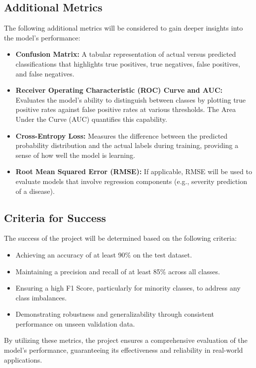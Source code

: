 \subsection{Additional Metrics}
The following additional metrics will be considered to gain deeper insights into the model's performance:
\begin{itemize}
    \item \textbf{Confusion Matrix:} A tabular representation of actual versus predicted classifications that highlights true positives, true negatives, false positives, and false negatives.
    \item \textbf{Receiver Operating Characteristic (ROC) Curve and AUC:} Evaluates the model's ability to distinguish between classes by plotting true positive rates against false positive rates at various thresholds. The Area Under the Curve (AUC) quantifies this capability.
    \item \textbf{Cross-Entropy Loss:} Measures the difference between the predicted probability distribution and the actual labels during training, providing a sense of how well the model is learning.
    \item \textbf{Root Mean Squared Error (RMSE):} If applicable, RMSE will be used to evaluate models that involve regression components (e.g., severity prediction of a disease).
\end{itemize}

\subsection{Criteria for Success}
The success of the project will be determined based on the following criteria:
\begin{itemize}
    \item Achieving an accuracy of at least 90\% on the test dataset.
    \item Maintaining a precision and recall of at least 85\% across all classes.
    \item Ensuring a high F1 Score, particularly for minority classes, to address any class imbalances.
    \item Demonstrating robustness and generalizability through consistent performance on unseen validation data.
\end{itemize}

By utilizing these metrics, the project ensures a comprehensive evaluation of the model's performance, guaranteeing its effectiveness and reliability in real-world applications.
